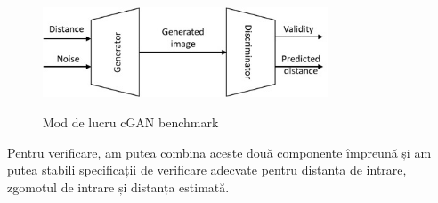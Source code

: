 \begin{figure}[ht]
\centering
{\includegraphics[width=8.5cm]{imagini/cganbench.jpeg}}
\caption{Mod de lucru cGAN benchmark}
\label{cganbench}
\end{figure}

Pentru verificare, am putea combina aceste două componente împreună și am putea stabili specificații de verificare adecvate pentru distanța de intrare, zgomotul de intrare și distanța estimată.

